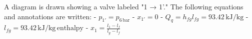 A diagram is drawn showing a valve labeled "1 → 1'." The following equations and annotations are written:  
- \( p_{1'} = p_{6 \, \text{bar}} \)  
- \( x_{1'} = 0 \)  
- \( Q_q = h_{fg} l_{fg} = 93.42 \, \text{kJ/kg} \)  
- \( l_{fg} = 93.42 \, \text{kJ/kg} \, \text{enthalpy} \)  
- \( x_1 = \frac{l_1 - l_f}{l_{g} - l_f} \)